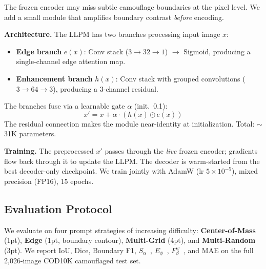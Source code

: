 The frozen encoder may miss subtle camouflage boundaries at the pixel level. We add a small module that amplifies boundary contrast \emph{before} encoding.

\noindent\textbf{Architecture.} The LLPM has two branches processing input image $x$:
\begin{itemize}
    \item \textbf{Edge branch} $e(x)$: Conv stack ($3 \!\rightarrow\! 32 \!\rightarrow\! 1$) $\rightarrow$ Sigmoid, producing a single-channel edge attention map.
    \item \textbf{Enhancement branch} $h(x)$: Conv stack with grouped convolutions ($3 \!\rightarrow\! 64 \!\rightarrow\! 3$), producing a 3-channel residual.
\end{itemize}
The branches fuse via a learnable gate $\alpha$ (init.\ 0.1):
\begin{equation}
    x' = x + \alpha \cdot (h(x) \odot e(x))
    \label{eq:llpm}
\end{equation}
The residual connection makes the module near-identity at initialization. Total: $\sim$31K parameters.

\noindent\textbf{Training.} The preprocessed $x'$ passes through the \emph{live} frozen encoder; gradients flow back through it to update the LLPM. The decoder is warm-started from the best decoder-only checkpoint. We train jointly with AdamW (lr $5\!\times\!10^{-5}$), mixed precision (FP16), 15 epochs.

\subsection{Evaluation Protocol}

We evaluate on four prompt strategies of increasing difficulty: \textbf{Center-of-Mass} (1pt), \textbf{Edge} (1pt, boundary contour), \textbf{Multi-Grid} (4pt), and \textbf{Multi-Random} (3pt). We report IoU, Dice, Boundary F1, $S_\alpha$~\cite{fan2017smeasure}, $E_\phi$~\cite{fan2018emeasure}, $F_\beta^w$~\cite{margolin2014fmeasure}, and MAE on the full 2,026-image COD10K camouflaged test set.
